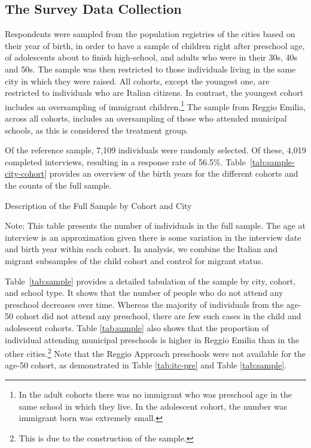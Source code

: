 \subsection{The Survey Data Collection}

Respondents were sampled from the population registries of the cities based on their year of birth, in order to have a sample of children right after preschool age, of adolescents about to finish high-school, and adults who were in their 30s, 40s and 50s. The sample was then restricted to those individuals living in the same city in which they were raised. All cohorts, except the youngest one, are restricted to individuals who are Italian citizens. In contrast, the youngest cohort includes an oversampling of immigrant children.\footnote{In the adult cohorts there was no immigrant who was preschool age in the same school in which they live. In the adolescent cohort, the number was immigrant born was extremely small.} The sample from Reggio Emilia, across all cohorts, includes an oversampling of those who attended municipal schools, as this is considered the treatment group.

Of the reference sample, 7,109 individuals were randomly selected. Of these, 4,019 completed interviews, resulting in a response rate of 56.5\%. Table~\ref{tab:sample-city-cohort} provides an overview of the birth years for the different cohorts and the counts of the full sample.
\begin{table}[H]
\centering
\begin{threeparttable}
	\caption{Description of the Full Sample by Cohort and City}\label{tab:sample-city-cohort}
	
\begin{tablenotes}
\footnotesize
Note: This table presents the number of individuals in the full sample. The age at interview is an approximation given there is some variation in the interview date and birth year within each cohort. In analysis, we combine the Italian and migrant subsamples of the child cohort and control for migrant status.
\end{tablenotes}
\end{threeparttable}
\end{table}

Table~\ref{tab:sample} provides a detailed tabulation of the sample by city, cohort, and school type. It shows that the number of people who do not attend any preschool decreases over time. Whereas the majority of individuals from the age-50 cohort did not attend any preschool, there are few such cases in the child and adolescent cohorts. Table \ref{tab:sample} also shows that the proportion of individual attending municipal preschools is higher in Reggio Emilia than in the other cities.\footnote{This is due to the construction of the sample.} Note that the Reggio Approach preschools were not available for the age-50 cohort, as demonstrated in Table \ref{tab:itc-pre} and Table \ref{tab:sample}. 

